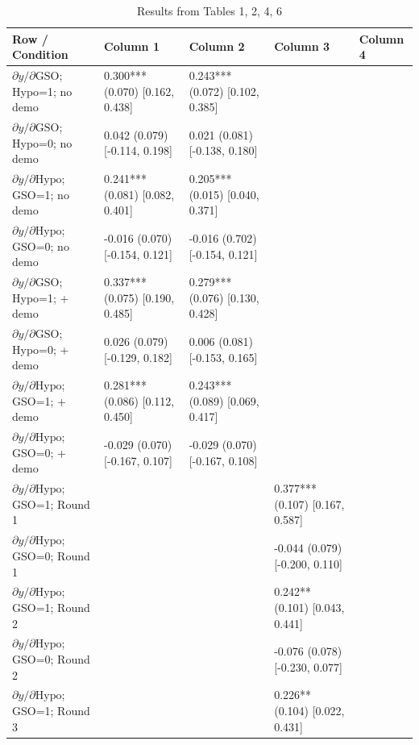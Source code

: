 \documentclass[12pt]{article}
\begin{document}
\begin{table}[H]
\centering
\begin{threeparttable}
\caption{Results from Tables 1, 2, 4, 6}
\label{tab:All_tables}
\scriptsize
\begin{tabular}{L{4.5cm} *{4}{C{2.2cm}}}
\toprule
\textbf{Row / Condition} & \textbf{Column 1} & \textbf{Column 2} & \textbf{Column 3} & \textbf{Column 4} \\
\midrule
$\partial y/\partial\mathrm{GSO}$; Hypo=1; no demo   & 0.300*** (0.070) [0.162, 0.438] & 0.243*** (0.072) [0.102, 0.385]  &       &       \\
$\partial y/\partial\mathrm{GSO}$; Hypo=0; no demo   & 0.042 (0.079) [-0.114, 0.198]   & 0.021 (0.081) [-0.138, 0.180] &       &       \\
$\partial y/\partial\mathrm{Hypo}$; GSO=1; no demo   & 0.241*** (0.081) [0.082, 0.401] & 0.205*** (0.015) [0.040, 0.371] &       &       \\
$\partial y/\partial\mathrm{Hypo}$; GSO=0; no demo   & -0.016 (0.070) [-0.154, 0.121]  & -0.016 (0.702) [-0.154, 0.121] &       &       \\
\addlinespace[2pt]
$\partial y/\partial\mathrm{GSO}$; Hypo=1; + demo    & 0.337*** (0.075) [0.190, 0.485] & 0.279*** (0.076) [0.130, 0.428] &       &       \\
$\partial y/\partial\mathrm{GSO}$; Hypo=0; + demo    & 0.026 (0.079) [-0.129, 0.182]   & 0.006 (0.081) [-0.153, 0.165]   &       &       \\
$\partial y/\partial\mathrm{Hypo}$; GSO=1; + demo    & 0.281*** (0.086) [0.112, 0.450] & 0.243*** (0.089) [0.069, 0.417] &       &       \\
$\partial y/\partial\mathrm{Hypo}$; GSO=0; + demo    & -0.029 (0.070) [-0.167, 0.107]  & -0.029 (0.070) [-0.167, 0.108]  &       &       \\
\addlinespace[4pt]
\midrule
$\partial y/\partial\mathrm{Hypo}$; GSO=1; Round 1   &       &       & 0.377*** (0.107) [0.167, 0.587] &       \\
$\partial y/\partial\mathrm{Hypo}$; GSO=0; Round 1   &       &       & -0.044 (0.079) [-0.200, 0.110] &       \\
$\partial y/\partial\mathrm{Hypo}$; GSO=1; Round 2   &       &       & 0.242** (0.101) [0.043, 0.441] &       \\
$\partial y/\partial\mathrm{Hypo}$; GSO=0; Round 2   &       &       & -0.076 (0.078) [-0.230, 0.077] &       \\
$\partial y/\partial\mathrm{Hypo}$; GSO=1; Round 3   &       &       & 0.226** (0.104) [0.022, 0.431] &       \\

\end{tabular}
\end{threeparttable}
\end{table}
\end{document}
